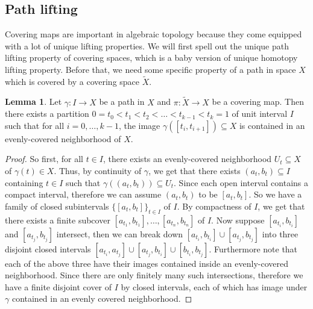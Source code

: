 \documentclass[letterpaper,11pt,twoside]{article}
\theoremstyle{definition}
\theoremstyle{definition}
\theoremstyle{definition}
\theoremstyle{definition}
\newtheorem{lemma}[proposition]{\textbf{Lemma}}
\theoremstyle{definition}
\theoremstyle{definition}
\theoremstyle{remark}
\theoremstyle{definition}
\begin{document}
\subsection{Path lifting}
Covering maps are important in algebraic topology because they come equipped with a lot of unique lifting properties. We will first spell out the unique path lifting property of covering spaces, which is a baby version of unique homotopy lifting property. Before that, we need some specific property of a path in space $X$ which is covered by a covering space $\tilde X$.
\begin{lemma}\label{L-5.1.1}
Let $\gamma : I \to X$ be a path in $X$ and $\pi : \tilde{X} \to X$ be a covering map. Then there exists a partition $0 = t_0 < t_1 < t_2 < \dots < t_{k-1} < t_k = 1$ of unit interval $I$ such that for all $i=0,\dots,k-1$, the image $\gamma ([t_i,t_{i+1}])\subseteq X$ is contained in an evenly-covered neighborhood of $X$.
\end{lemma}
\begin{proof}
So first, for all $t\in I$, there exists an evenly-covered neighborhood $U_t \subseteq X$ of $\gamma(t) \in X$. Thus, by continuity of $\gamma$, we get that there exists $(a_t,b_t)\subseteq I$ containing $t\in I$ such that $\gamma((a_t,b_t))\subseteq U_t$. Since each open interval contains a compact interval, therefore we can assume $(a_t,b_t)$ to be $[a_t,b_t]$. So we have a family of closed subintervals $\{[a_t,b_t]\}_{t\in I}$ of $I$. By compactness of $I$, we get that there exists a finite subcover $[a_{t_1},b_{t_1}], \dots,[a_{t_n},b_{t_n}]$ of $I$. Now suppose $[a_{t_i},b_{t_i}]$ and $[a_{t_j},b_{t_j}]$ intersect, then we can break down $[a_{t_i},b_{t_i}]\cup [a_{t_j},b_{t_j}]$ into three disjoint closed intervals $[a_{t_i},a_{t_j}] \cup [a_{t_j},b_{t_i}] \cup [b_{t_i},b_{t_j}]$. Furthermore note that each of the above three have their images contained inside an evenly-covered neighborhood. Since there are only finitely many such intersections, therefore we have a finite disjoint cover of $I$ by closed intervals, each of which has image under $\gamma$ contained in an evenly covered neighborhood. 
\end{proof}
\end{document}
